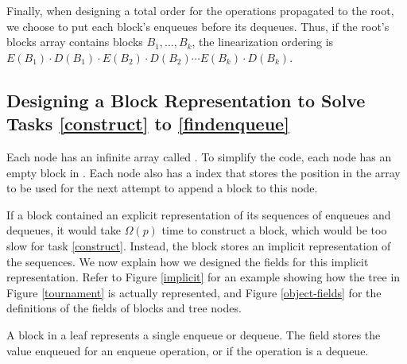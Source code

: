 Finally, when designing a total order for the operations propagated to the root, we choose
to put each block's enqueues before its dequeues.
Thus, if the root's blocks array contains blocks $B_1, \ldots, B_k$, the 
linearization ordering is 
$E(B_1)\cdot D(B_1) \cdot E(B_2) \cdot D(B_2) \cdots E(B_k) \cdot D(B_k)$.



\subsection{Designing a Block Representation to Solve Tasks \ref{construct} to \ref{findenqueue}}
\label{sec:fields}

Each node has an infinite array called .
To simplify the code, each node has an empty block in .
Each node also has a  index that stores the position in the  array to be used
for the next attempt to append a block to this node.

If a block contained an explicit representation of its sequences of enqueues and dequeues,
it would take $\Omega(p)$ time to construct a block, which would be too slow for task \ref{construct}.
Instead, the block stores an implicit representation of the sequences.
We now explain how we designed the fields for this implicit representation. 
Refer to Figure \ref{implicit} for an example showing how the tree in Figure \ref{tournament} is actually represented, and Figure \ref{object-fields} for the definitions of the fields of blocks and tree nodes.

A block in a leaf represents a single enqueue or dequeue.  The  field stores the value
enqueued for an enqueue operation, or  if the operation is a dequeue.


